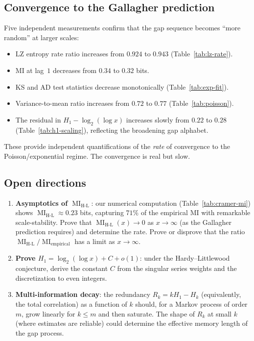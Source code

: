 \documentclass[11pt, a4paper]{amsart}
\theoremstyle{plain}
\theoremstyle{definition}
\newcommand{\MI}{\operatorname{MI}}
\begin{document}
\subsection{Convergence to the Gallagher prediction}

Five independent measurements confirm that the gap sequence becomes ``more random'' at larger scales:
\begin{itemize}
\item LZ entropy rate ratio increases from $0.924$ to $0.943$ (Table~\ref{tab:lz-rate}).
\item MI at lag~$1$ decreases from $0.34$ to $0.32$ bits.
\item KS and AD test statistics decrease monotonically (Table~\ref{tab:exp-fit}).
\item Variance-to-mean ratio increases from $0.72$ to $0.77$ (Table~\ref{tab:poisson}).
\item The residual in $H_1 - \log_2(\log x)$ increases slowly from $0.22$ to $0.28$ (Table~\ref{tab:h1-scaling}), reflecting the broadening gap alphabet.
\end{itemize}

These provide independent quantifications of the \emph{rate} of convergence to the Poisson/exponential regime. The convergence is real but slow.

\subsection{Open directions}

\begin{enumerate}
\item \textbf{Asymptotics of $\MI_{\text{H-L}}$}: our numerical computation (Table~\ref{tab:cramer-mi}) shows $\MI_{\text{H-L}} \approx 0.23$ bits, capturing $71\%$ of the empirical MI with remarkable scale-stability. Prove that $\MI_{\text{H-L}}(x) \to 0$ as $x \to \infty$ (as the Gallagher prediction requires) and determine the rate. Prove or disprove that the ratio $\MI_{\text{H-L}} / \MI_{\text{empirical}}$ has a limit as $x \to \infty$.

\item \textbf{Prove $H_1 = \log_2(\log x) + C + o(1)$}: under the Hardy--Littlewood conjecture, derive the constant $C$ from the singular series weights and the discretization to even integers.

\item \textbf{Multi-information decay}: the redundancy $R_k = k H_1 - H_k$ (equivalently, the total correlation) as a function of $k$ should, for a Markov process of order $m$, grow linearly for $k \le m$ and then saturate. The shape of $R_k$ at small $k$ (where estimates are reliable) could determine the effective memory length of the gap process.
\end{enumerate}
\end{document}
